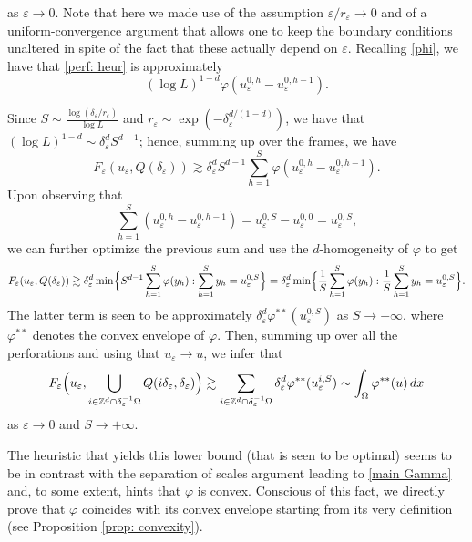 \documentclass{article}
\theoremstyle{plain}
\theoremstyle{definition}
\def\e{\varepsilon}
\newcommand{\f}{\varphi}
\numberwithin{equation}{section}
\begin{document}
as $\e\to0$. Note that here we made use of the assumption $\e/r_\e\to0$ and of a uniform-convergence argument that allows one to keep the boundary conditions unaltered in spite of the fact that these actually depend on $\e$. Recalling \eqref{phi}, we have that \eqref{perf: heur} is approximately
    \begin{equation*}
         (\log L)^{1-d}\varphi(u_\varepsilon^{0,h}-u_\varepsilon^{0,h-1}).
    \end{equation*}

Since $S\sim \frac{\log (\delta_\varepsilon/r_\varepsilon)}{\log L}$ and $r_\varepsilon \sim\exp(-\delta_\varepsilon^{d/(1-d)})$, we have that $(\log L)^{1-d}\sim \delta_\varepsilon^dS^{d-1}$; hence, summing up over the frames, we have
\begin{equation*}
      F_{\varepsilon}(u_\varepsilon, Q(\delta_\varepsilon))  \gtrsim \delta_\varepsilon^dS^{d-1}\sum_{h=1}^S \varphi(u_\varepsilon^{0,h}-u_\varepsilon^{0,h-1}).
      \end{equation*}   
Upon observing that
\begin{equation*}
    \sum_{h=1}^S(u_\varepsilon^{0,h}-u_\varepsilon^{0,h-1})=u_\varepsilon^{0,S}-u_\varepsilon^{0,0}=u_\varepsilon^{0,S},
\end{equation*}
we can further optimize the previous sum and use the $d$-homogeneity of $\varphi$ to get
\begin{equation*}
    F_{\varepsilon}(u_\varepsilon, Q(\delta_\varepsilon)) \gtrsim \delta_\varepsilon^d\min\Bigl\{ S^{d-1}\sum_{h=1}^S \varphi(y_h): \sum_{h=1}^Sy_h=u_\varepsilon^{0,S}\Bigr\} = \delta_\varepsilon^d \min\Bigl\{\frac{1}{S}\sum_{h=1}^S \varphi(y_h): \frac{1}{S}\sum_{h=1}^Sy_h=u_\varepsilon^{0,S}\Bigr\}.
\end{equation*}
The latter term is seen to be approximately $\delta_\varepsilon^d\varphi^{**}(u_\varepsilon^{0,S})$ as $S\to+\infty$, where $\f^{**}$ denotes the convex envelope of $\f$. Then, summing up over all the perforations and using that $u_\e\to u$, we infer that 
\begin{equation*}
   F_{\varepsilon}\Bigl(u_\varepsilon, \bigcup_{i\in \mathbb Z^d \cap\delta_\varepsilon^{-1}\Omega} Q(i\delta_\varepsilon, \delta_\varepsilon)\Bigr)\gtrsim \sum_{i\in \mathbb Z^d \cap\delta_\varepsilon^{-1}\Omega}  \delta_\varepsilon^d\varphi^{**}(u_\varepsilon^{i,S}) \sim \int_{\Omega}\varphi^{**}(u)\, dx
\end{equation*}
as $\e\to0$ and $S\to+\infty$.

The heuristic that yields this lower bound (that is seen to be optimal) seems to be in contrast with the separation of scales argument leading to \eqref{main Gamma} and, to some extent, hints that $\varphi$ is convex. Conscious of this fact, we directly prove that $\f$ coincides with its convex envelope starting from its very definition (see Proposition \ref{prop: convexity}).  
\end{document}
